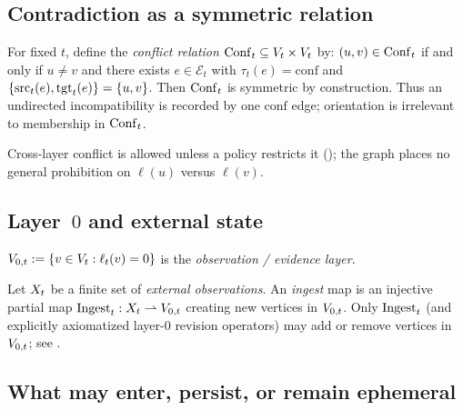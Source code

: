 \subsection{Contradiction as a symmetric relation}
\label{sec:formal-conflict-graph}

\begin{definition}
\label{def:conflict-relation}
For fixed $t$, define the \emph{conflict relation} $\mathrm{Conf}_t\subseteq V_t\times V_t$ by: $(u,v)\in\mathrm{Conf}_t$ if and only if $u\neq v$ and there exists $e\in\mathcal{E}_t$ with $\tau_t(e)=\mathrm{conf}$ and $\{\mathrm{src}_t(e),\mathrm{tgt}_t(e)\}=\{u,v\}$.
Then $\mathrm{Conf}_t$ is symmetric by construction.
Thus an undirected incompatibility is recorded by one $\mathrm{conf}$ edge; orientation is irrelevant to membership in $\mathrm{Conf}_t$.
\end{definition}

Cross-layer conflict is allowed unless a policy restricts it (); the graph places no general prohibition on $\ell(u)$ versus $\ell(v)$.

\subsection{Layer~\texorpdfstring{$0$}{0} and external state}
\label{sec:formal-layer0}

\begin{definition}
$V_{0,t} := \{ v\in V_t : \ell_t(v)=0\}$ is the \emph{observation / evidence layer}.
\end{definition}

\begin{definition}
\label{def:external-interface}
Let $X_t$ be a finite set of \emph{external observations}.
An \emph{ingest} map is an injective partial map $\mathrm{Ingest}_t : X_t \rightharpoonup V_{0,t}$ creating new vertices in $V_{0,t}$.
Only $\mathrm{Ingest}_t$ (and explicitly axiomatized layer-$0$ revision operators) may add or remove vertices in $V_{0,t}$; see .
\end{definition}

\subsection{What may enter, persist, or remain ephemeral}
\label{sec:scope-flow}

